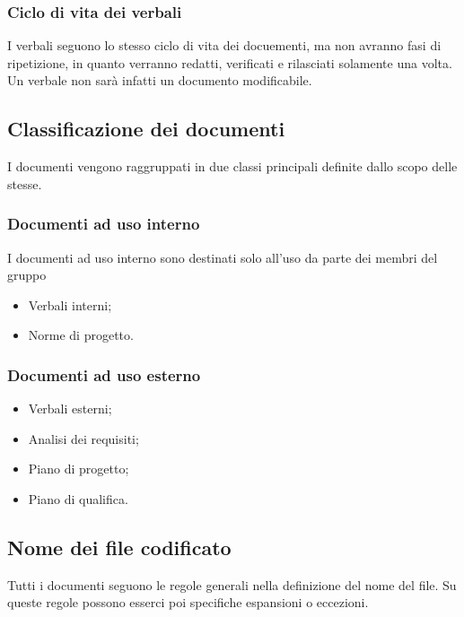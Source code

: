 \subsubsection{Ciclo di vita dei verbali}

I verbali seguono lo stesso ciclo di vita dei docuementi, ma non avranno fasi di ripetizione, in quanto verranno redatti, verificati e rilasciati solamente una volta. Un verbale non sarà infatti un documento modificabile.

\subsection{Classificazione dei documenti}

I documenti vengono raggruppati in due classi principali definite dallo scopo delle stesse.

\subsubsection{Documenti ad uso interno}

I documenti ad uso interno sono destinati solo all'uso da parte dei membri del gruppo 

\begin{itemize}
    \item Verbali interni;
    \item Norme di progetto.
\end{itemize}

\subsubsection{Documenti ad uso esterno}

\begin{itemize}
    \item Verbali esterni;
    \item Analisi dei requisiti;
    \item Piano di progetto;
    \item Piano di qualifica.
\end{itemize}

\subsection{Nome dei file codificato}

Tutti i documenti seguono le regole generali nella definizione del nome del file. Su queste regole possono esserci poi specifiche espansioni o eccezioni.

